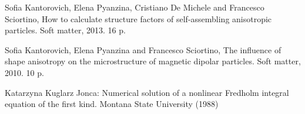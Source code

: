 \documentclass[a4paper,14pt]{extarticle}
\begin{document}
\begin{thebibliography}{99}
        Sofia Kantorovich, Elena Pyanzina, Cristiano De Michele and Francesco Sciortino, How to calculate structure factors of self-assembling anisotropic particles. Soft matter, 2013. 16 p.

        Sofia Kantorovich, Elena Pyanzina and Francesco Sciortino, The influence of shape anisotropy on the microstructure of magnetic dipolar particles. Soft matter, 2010. 10 p.

        Katarzyna Kuglarz Jonca: Numerical solution of a nonlinear Fredholm integral equation of the first kind. Montana State University (1988)

    \end{thebibliography}
    \endgroup
\end{document}
